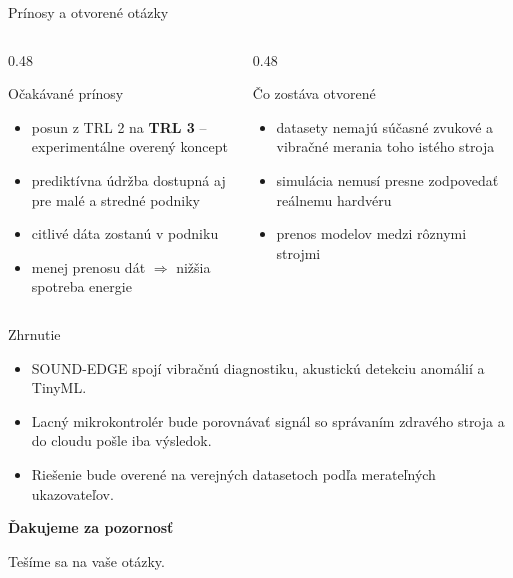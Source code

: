 \documentclass[aspectratio=169,11pt]{beamer}
\begin{document}
\begin{frame}{Prínosy a otvorené otázky}
  \begin{columns}[T]
    \begin{column}{0.48\textwidth}
      \begin{exampleblock}{Očakávané prínosy}
        \begin{itemize}
          \item posun z TRL 2 na \textbf{TRL 3} -- experimentálne overený koncept
          \item prediktívna údržba dostupná aj pre malé a stredné podniky
          \item citlivé dáta zostanú v podniku
          \item menej prenosu dát $\Rightarrow$ nižšia spotreba energie
        \end{itemize}
      \end{exampleblock}
    \end{column}
    \begin{column}{0.48\textwidth}
      \begin{alertblock}{Čo zostáva otvorené}
        \begin{itemize}
          \item datasety nemajú súčasné zvukové a vibračné merania toho istého stroja
          \item simulácia nemusí presne zodpovedať reálnemu hardvéru
          \item prenos modelov medzi rôznymi strojmi
        \end{itemize}
      \end{alertblock}
    \end{column}
  \end{columns}
\end{frame}

\begin{frame}{Zhrnutie}
  \begin{itemize}
    \item SOUND-EDGE spojí vibračnú diagnostiku, akustickú detekciu anomálií a TinyML.
    \item Lacný mikrokontrolér bude porovnávať signál so správaním zdravého stroja a do cloudu pošle iba výsledok.
    \item Riešenie bude overené na verejných datasetoch podľa merateľných ukazovateľov.
  \end{itemize}
  \bigskip
  \centering
  {\Large\color{seNavy}\textbf{Ďakujeme za pozornosť}}\par\smallskip
  {\color{seText!70}Tešíme sa na vaše otázky.}
\end{frame}
\end{document}
